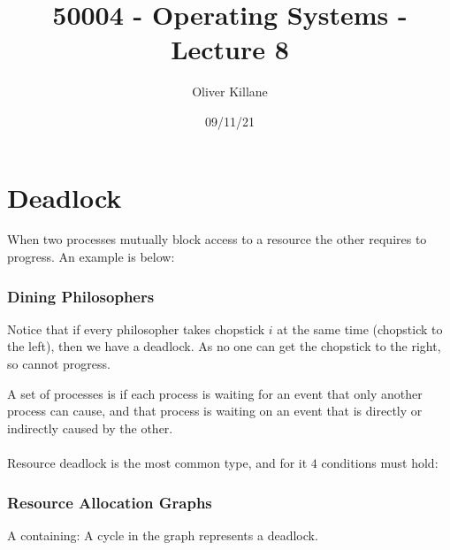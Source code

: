 \documentclass{report}
\title{50004 - Operating Systems - Lecture 8}
\author{Oliver Killane}
\date{09/11/21}
\begin{document}
    \maketitle

    \section*{Deadlock}
        When two processes mutually block access to a resource the other requires to progress. An example is below:
        \subsubsection*{Dining Philosophers}
            Notice that if every philosopher takes chopstick $i$ at the same time (chopstick to the left), then we have a deadlock. As no one can get the chopstick to the right, so cannot progress.
        
        A set of processes is  if each process is waiting for an event that only another process can cause, and that process is waiting on an event that is directly or indirectly caused by the other.
        \\
        \\Resource deadlock is the most common type, and for it $4$ conditions must hold:
        \begin{itemize}
        \end{itemize}
        \subsubsection*{Resource Allocation Graphs}
            A  containing:
            A cycle in the graph represents a deadlock.
    
\end{document}
